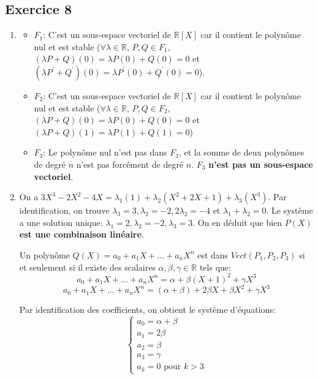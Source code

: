 \documentclass[french]{yLectureNote}
\begin{document}
\subsection{Exercice 8}
\begin{enumerate}
    \item
    \begin{itemize}
        \item $F_1$: C'est un sous-espace vectoriel de $\mathbb{R}[X]$ car il contient le polynôme nul et est stable ($\forall \lambda \in \mathbb{R}$, $P, Q \in F_{1}$, $(\lambda P+Q)(0) = \lambda P(0)+Q(0)=0$ et $(\lambda P^{\prime}+Q^{\prime})(0)=\lambda P^{\prime}(0)+Q^{\prime}(0)=0$).

        \item $F_2$: C'est un sous-espace vectoriel de $\mathbb{R}[X]$ car il contient le polynôme nul et est stable ($\forall\lambda\in\mathbb{R}$, $P,Q\in F_{2}$, $(\lambda P+Q)(0)=\lambda P(0)+Q(0)=0$ et $(\lambda P+Q)(1)=\lambda P(1)+Q(1)=0$)

        \item $F_3$: Le polynôme nul n'est pas dans $F_3$, et la somme de deux polynômes de degré $n$ n'est pas forcément de degré $n$. $F_3$ \textbf{n'est pas un sous-espace vectoriel}.
    \end{itemize}
    \item On a $3X^{3}-2X^{2}-4X = \lambda_1(1) + \lambda_2(X^2+2X+1) + \lambda_3(X^3)$. Par identification, on trouve $\lambda_3=3, \lambda_2=-2, 2\lambda_2=-4$ et $\lambda_1+\lambda_2=0$. Le système a une solution unique: $\lambda_1=2, \lambda_2=-2, \lambda_3=3$. On en déduit que bien $P(X)$ \textbf{est une combinaison linéaire}.




Un polynôme $Q(X)=a_{0}+a_{1}X+...+a_{n}X^{n}$ est dans $Vect(P_{1},P_{2},P_{3})$ si et seulement si il existe des scalaires $\alpha,\beta,\gamma\in\mathbb{R}$ tels que:
    $$a_{0}+a_{1}X+...+a_{n}X^{n}=\alpha+\beta(X+1)^{2}+\gamma X^{3}$$
    $$a_{0}+a_{1}X+...+a_{n}X^{n}=(\alpha+\beta)+2\beta X+\beta X^{2}+\gamma X^{3}$$

    Par identification des coefficients, on obtient le système d'équations:
    \[
\left\{\begin{matrix}
 a_{0} = \alpha+\beta \\
        a_{1} = 2\beta \\
        a_{2} = \beta \\
        a_{3} = \gamma \\
        a_{k} = 0 \text{ pour } k > 3
\end{matrix}\right.\]


\end{enumerate}
\end{document}
